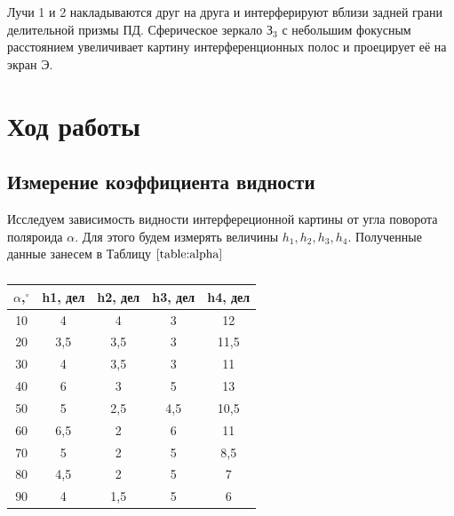 \documentclass[a4paper,12pt]{article}
\begin{document}
	Лучи 1 и 2 накладываются друг на друга и интерферируют вблизи задней грани делительной призмы ПД. Сферическое зеркало $З_3$ с небольшим фокусным расстоянием увеличивает картину интерференционных полос и проецирует её на экран Э.
	
\newpage

\section*{Ход работы}

\subsection*{Измерение коэффициента видности}

Исследуем зависимость видности интерфереционной картины от угла поворота поляроида $\alpha$. Для этого будем измерять величины $h_1,h_2, h_3, h_4$. Полученные данные занесем в Таблицу $\ref{table:alpha}$

\begin{table}[h]
\begin{center}
\caption{}
\label{table:alpha}
\begin{tabular}{|c|c|c|c|c|}
\hline 
$\alpha$,$^\circ $  & h1, дел & h2, дел & h3, дел & h4, дел \\ \hline
10                     & 4                         & 4                         & 3                & 12               \\ \hline
20                     & 3,5                       & 3,5                       & 3                & 11,5             \\ \hline
30                     & 4                         & 3,5                       & 3                & 11               \\ \hline
40                     & 6                         & 3                         & 5                & 13               \\ \hline
50                     & 5                         & 2,5                       & 4,5              & 10,5             \\ \hline
60                     & 6,5                       & 2                         & 6                & 11               \\ \hline
70                     & 5                         & 2                         & 5                & 8,5              \\ \hline
80                     & 4,5                       & 2                         & 5                & 7                \\ \hline
90                     & 4                         & 1,5                       & 5                & 6                \\ \hline
\end{tabular}
\end{center}
\end{table}
\end{document}
